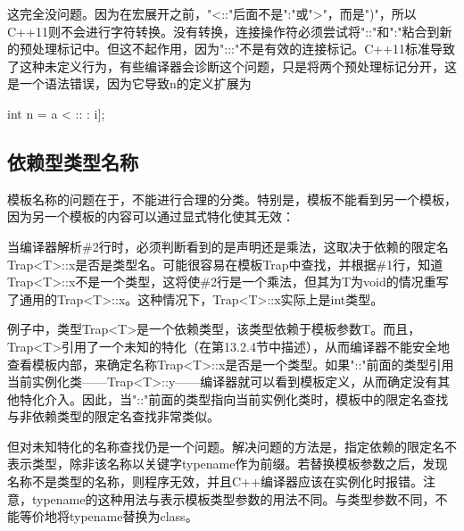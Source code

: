 这完全没问题。因为在宏展开之前，"<::"后面不是":"或">"，而是")"，所以C++11则不会进行字符转换。没有转换，连接操作符必须尝试将"::"和":"粘合到新的预处理标记中。但这不起作用，因为":::"不是有效的连接标记。C++11标准导致了这种未定义行为，有些编译器会诊断这个问题，只是将两个预处理标记分开，这是一个语法错误，因为它导致n的定义扩展为

\begin{cpp}
int n = a < :: : i];
\end{cpp}

\subsection{依赖型类型名称}

模板名称的问题在于，不能进行合理的分类。特别是，模板不能看到另一个模板，因为另一个模板的内容可以通过显式特化使其无效：


当编译器解析\#2行时，必须判断看到的是声明还是乘法，这取决于依赖的限定名Trap<T>::x是否是类型名。可能很容易在模板Trap中查找，并根据\#1行，知道Trap<T>::x不是一个类型，这将使\#2行是一个乘法，但其为T为void的情况重写了通用的Trap<T>::x。这种情况下，Trap<T>::x实际上是int类型。

例子中，类型Trap<T>是一个依赖类型，该类型依赖于模板参数T。而且，Trap<T>引用了一个未知的特化（在第13.2.4节中描述），从而编译器不能安全地查看模板内部，来确定名称Trap<T>::x是否是一个类型。如果"::"前面的类型引用当前实例化类——Trap<T>::y——编译器就可以看到模板定义，从而确定没有其他特化介入。因此，当"::"前面的类型指向当前实例化类时，模板中的限定名查找与非依赖类型的限定名查找非常类似。

但对未知特化的名称查找仍是一个问题。解决问题的方法是，指定依赖的限定名不表示类型，除非该名称以关键字typename作为前缀。若替换模板参数之后，发现名称不是类型的名称，则程序无效，并且C++编译器应该在实例化时报错。注意，typename的这种用法与表示模板类型参数的用法不同。与类型参数不同，不能等价地将typename替换为class。


